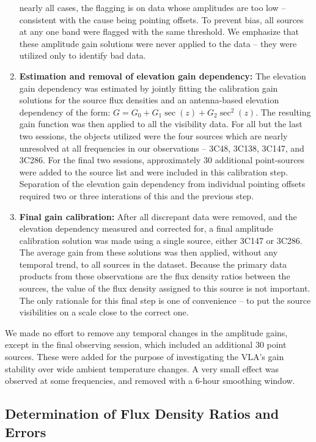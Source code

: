 \documentclass{aastex}
\begin{document}
\begin{enumerate}
  nearly all cases, the flagging is on data whose amplitudes are too
  low -- consistent with the cause being pointing offsets. To prevent
  bias, all sources at any one band were flagged with the same
  threshold.  We emphasize that these amplitude gain solutions were
  never applied to the data -- they were utilized only to identify bad
  data.
  \item {\bf Estimation and removal of elevation gain dependency:} The
  elevation gain dependency was estimated by jointly fitting the
  calibration gain solutions for the source flux densities and an
  antenna-based elevation dependency of the form: $G = G_0 +
  G_1\sec(z) + G_2\sec^2(z)$. The resulting gain function was then
  applied to all the visibility data.  For all but the last two
  sessions, the objects utilized were the four sources which are
  nearly unresolved at all frequencies in our observations -- 3C48,
  3C138, 3C147, and 3C286.  For the final two sessions, approximately
  30 additional point-sources were added to the source list and were
  included in this calibration step.  Separation of the elevation gain
  dependency from individual pointing offsets required two or three
  interations of this and the previous step.
\item {\bf Final gain calibration:} After all discrepant data were
  removed, and the elevation dependency measured and corrected for, a
  final amplitude calibration solution was made using a single source,
  either 3C147 or 3C286.  The average gain from these solutions was
  then applied, without any temporal trend, to all sources in the
  dataset.  Because the primary data products from these observations
  are the flux density ratios between the sources, the value of the
  flux density assigned to this source is not important.  The only
  rationale for this final step is one of convenience -- to put the
  source visibilities on a scale close to the correct one.
\end{enumerate}

We made no effort to remove any temporal changes in the amplitude
gains, except in the final observing session, which included an
additional 30 point sources.  These were added for the purpose of
investigating the VLA's gain stability over wide ambient temperature
changes.  A very small effect was observed at some frequencies, and
removed with a 6-hour smoothing window.

\subsection{Determination of Flux Density Ratios and Errors}
\end{document}
